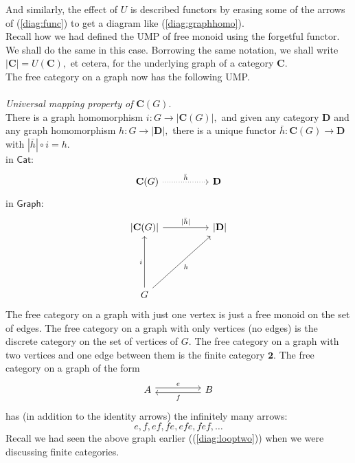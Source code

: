 And similarly, the effect of $U$ is described functors by erasing some of the arrows of (\ref{diag:func}) to get a diagram like (\ref{diag:graphhomo}).\\
Recall how we had defined the UMP of free monoid using the forgetful functor. We shall do the same in this case. Borrowing the same notation, we shall write $|\mathbf{C}| = U(\mathbf{C}),$ et cetera, for the underlying graph of a category $\mathbf{C}.$\\
The free category on a graph now has the following UMP.\\\\
\emph{Universal mapping property of }$\mathbf{C}(G).$\\
There is a graph homomorphism $i:G \to |\mathbf{C}(G)|,$ and given any category $\mathbf{D}$ and any graph homomorphism $h:G \to |\mathbf{D}|,$ there is a unique functor $\bar{h}:\mathbf{C}(G) \to \mathbf{D}$ with $|\bar{h}|\circ i = h.$\\
in $\mathsf{Cat}$:
\begin{equation*} 
	\begin{tikzcd}
		\mathbf{C}(G) \arrow[rr, dotted, "\bar{h}"] && \mathbf{D}
	\end{tikzcd}
\end{equation*}
in $\mathsf{Graph}$:
\begin{equation*} 
	\begin{tikzcd}
	{\vert}\mathbf{C}(G){\vert} \arrow[rr, "{\vert}\bar{h}{\vert}"] &  & {\vert}\mathbf{D}{\vert} \\&  &\\&  &\\
	G \arrow[uuu, "i"] \arrow[rruuu, "h"']&&                        
	\end{tikzcd}
\end{equation*}
\example{} The free category on a graph with just one vertex is just a free monoid on the set of edges. The free category on a graph with only vertices (no edges) is the discrete category on the set of vertices of $G.$ The free category on a graph with two vertices and one edge between them is the finite category $\mathbf{2}.$ The free category on a graph of the form
\begin{equation*} 
	\begin{tikzcd}
		A \arrow[rr, shift left = 1, "e"] && B \arrow[ll, shift left = 1, "f"]
	\end{tikzcd}
\end{equation*}
has (in addition to the identity arrows) the infinitely many arrows:
\begin{equation*} 
	e, f, ef, fe, efe, fef, \ldots
\end{equation*}
Recall we had seen the above graph earlier ((\ref{diag:looptwo})) when we were discussing finite categories.